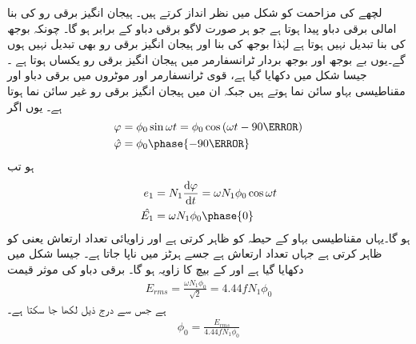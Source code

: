 لچھے کی مزاحمت کو شکل  میں نظر انداز کرتے ہیں۔ ہیجان انگیز برقی رو  کی بنا امالی برقی دباو  پیدا ہوتا ہے جو ہر صورت لاگو برقی دباو  کے برابر ہو گا۔ چونکہ بوجھ کی بنا   تبدیل نہیں ہوتا ہے لہٰذا بوجھ کی بنا  اور ہیجان انگیز برقی رو  بھی تبدیل نہیں ہوں گے۔یوں بے بوجھ اور بوجھ بردار ٹرانسفارمر میں ہیجان انگیز برقی رو  یکساں ہوتا ہے ۔جیسا شکل  میں دکھایا گیا ہے، قوی ٹرانسفارمر اور موٹروں میں برقی دباو اور مقناطیسی بہاو سائن نما ہوتے ہیں جبکہ ان میں ہیجان انگیز برقی رو  غیر سائن نما ہوتا ہے۔ یوں اگر
\begin{gather}
\begin{aligned}
\varphi&=\phi_0 \sin \omega t=\phi_0 \cos \left(\omega t -90\degree \right)\\
\hat{\varphi}&=\phi_0 \phase{-90\degree}
\end{aligned}
\end{gather}
ہو تب
\begin{gather}
\begin{aligned}\label{مساوات_ٹڑانسفارمر_دباو_سمتیہ}
e_1&=N_1 \frac{\dif \varphi}{\dif t}=\omega N_1 \phi_0 \cos \omega t\\
\hat{E_1}&=\omega N_1 \phi_0 \phase{0}
\end{aligned}
\end{gather}
ہو گا۔یہاں  مقناطیسی بہاو کے حیطہ کو ظاہر کرتی ہے اور  زاویائی تعداد ارتعاش یعنی  کو ظاہر کرتی ہے  جہاں  تعداد ارتعاش ہے جسے ہرٹز  میں ناپا جاتا ہے۔ جیسا شکل  میں دکھایا گیا ہے  اور  کے بیچ  کا زاویہ ہو گا۔ برقی دباو  کی موثر قیمت   
\begin{align}
E_{rms}=\frac{\omega N_1 \phi_0}{\sqrt{2}}=4.44 f N_1 \phi_0
\end{align}
ہے جس سے درج ذیل لکھا جا سکتا ہے۔
\begin{align}\label{مساوات_ٹرانسفارمر_درکار_ہیجان_بہاو}
\phi_0=\frac{E_{rms}}{4.44 f N_1 \phi_0}
\end{align}

